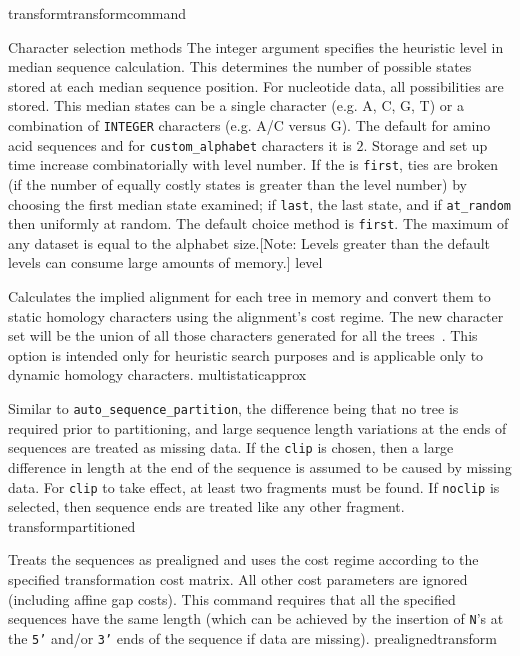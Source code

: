 \begin{command}{transform}{transformcommand}
\begin{arguments}
\begin{argumentgroup}{Character selection methods}
{The integer argument specifies the heuristic level in median sequence calculation. 
This determines the number of possible states stored at each median sequence position. 
For nucleotide data, all possibilities are stored. This median states can be a single character 
(e.g. A, C, G, T) or a combination of \texttt{INTEGER} characters (e.g. A/C versus G).
The default for amino acid sequences and for \texttt{custom\_alphabet} characters 
it is $2$. Storage and set up time increase combinatorially with level number. 
If the \poylident is \texttt{first}, ties are broken (if the number of equally costly states 
is greater than the level number) by choosing the first median state examined; 
if \texttt{last}, the last state, and if \texttt{at\_random} then uniformly at random.
The default choice method is \texttt{first}. The maximum  of 
any dataset is equal to the alphabet size.[Note: Levels greater than the default 
levels can consume large amounts of memory.] }
{level}

{Calculates the implied alignment for each tree in memory
and convert them to static homology characters using the alignment's
cost regime. The new character set will be the union of all those
characters generated for all the trees~\cite{wheeler1995a}. This option is intended only
for heuristic search purposes and is applicable only to dynamic homology characters.}
{multistaticapprox}

{Similar to \texttt{auto\_sequence\_partition}, the difference being that no tree is
required prior to partitioning, and large sequence length variations
at the ends of sequences are treated as missing data. If the \poylident \texttt{clip} 
is chosen, then a large difference in length at the end of the sequence is assumed to be caused by
missing data. For \texttt{clip} to take effect, at least two fragments must
be found. If \poylident \texttt{noclip} is selected, then sequence ends are treated like
any other fragment.}
{transformpartitioned}

{Treats the sequences as prealigned and uses the
cost regime according to the specified transformation cost
matrix. All other cost parameters are ignored (including affine
gap costs). This command requires that all the specified sequences 
have the same length (which can be achieved by the insertion of \texttt{N}'s
at the \texttt{5'} and/or \texttt{3'} ends of the sequence if data are missing).}
{prealignedtransform}


\end{argumentgroup}
\end{arguments}
\end{command}
